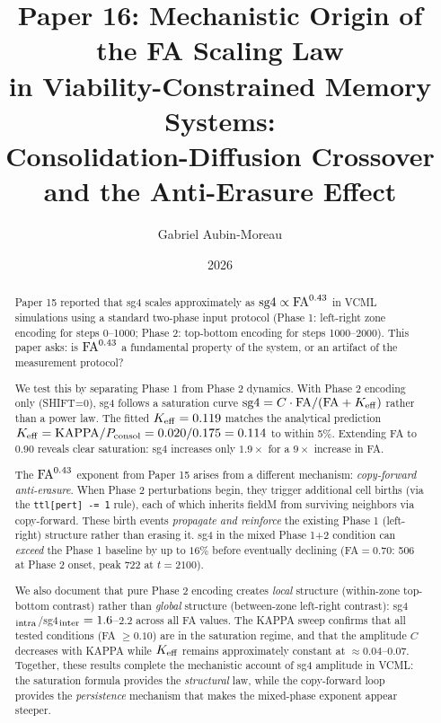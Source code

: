 \documentclass[11pt]{article}
\title{\textbf{Paper 16: Mechanistic Origin of the FA Scaling Law\\
in Viability-Constrained Memory Systems:\\
Consolidation-Diffusion Crossover and the Anti-Erasure Effect}}
\author{Gabriel Aubin-Moreau}
\date{2026}
\begin{document}
\maketitle

\begin{abstract}
Paper 15 reported that sg4 scales approximately as
${\rm sg4} \propto {\rm FA}^{0.43}$ in VCML simulations using a standard two-phase
input protocol (Phase 1: left-right zone encoding for steps 0--1000;
Phase 2: top-bottom encoding for steps 1000--2000).
This paper asks: is ${\rm FA}^{0.43}$ a fundamental property of the system,
or an artifact of the measurement protocol?

We test this by separating Phase 1 from Phase 2 dynamics.
With Phase 2 encoding only (SHIFT=0), sg4 follows a saturation curve
${\rm sg4} = C \cdot {\rm FA}/({\rm FA} + K_{\rm eff})$ rather than a power law.
The fitted $K_{\rm eff} = 0.119$ matches the analytical prediction
$K_{\rm eff} = {\rm KAPPA}/P_{\rm consol} = 0.020/0.175 = 0.114$ to within 5\%.
Extending FA to 0.90 reveals clear saturation: sg4 increases only $1.9\times$
for a $9\times$ increase in FA.

The ${\rm FA}^{0.43}$ exponent from Paper 15 arises from a different mechanism:
\emph{copy-forward anti-erasure}.
When Phase 2 perturbations begin, they trigger additional cell births (via
the \texttt{ttl[pert] -= 1} rule), each of which inherits fieldM from
surviving neighbors via copy-forward.
These birth events \emph{propagate and reinforce} the existing Phase 1
(left-right) structure rather than erasing it.
sg4 in the mixed Phase 1+2 condition can \emph{exceed} the Phase 1 baseline by
up to $16\%$ before eventually declining (FA$=0.70$: 506 at Phase 2 onset,
peak 722 at $t=2100$).

We also document that pure Phase 2 encoding creates \emph{local} structure
(within-zone top-bottom contrast) rather than \emph{global} structure
(between-zone left-right contrast): sg4$_{\rm intra}$/sg4$_{\rm inter} = 1.6$--$2.2$
across all FA values.
The KAPPA sweep confirms that all tested conditions (FA $\geq 0.10$) are
in the saturation regime, and that the amplitude $C$ decreases with KAPPA while
$K_{\rm eff}$ remains approximately constant at $\approx 0.04$--$0.07$.
Together, these results complete the mechanistic account of sg4 amplitude
in VCML: the saturation formula provides the \emph{structural} law,
while the copy-forward loop provides the \emph{persistence} mechanism
that makes the mixed-phase exponent appear steeper.
\end{abstract}
\end{document}

